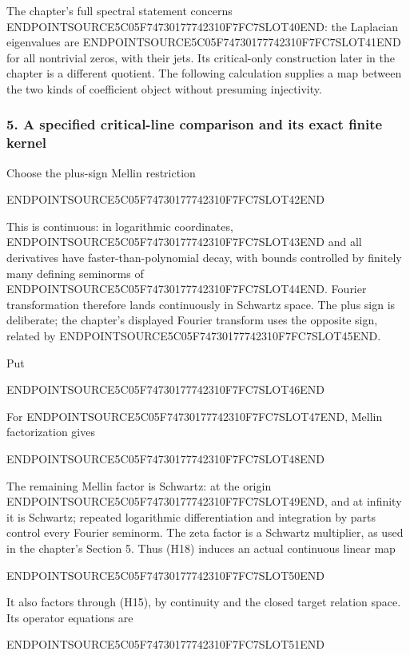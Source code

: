 The chapter's full spectral statement concerns ENDPOINTSOURCE5C05F74730177742310F7FC7SLOT40END: the Laplacian eigenvalues are ENDPOINTSOURCE5C05F74730177742310F7FC7SLOT41END for all nontrivial zeros, with their jets. Its critical-only construction later in the chapter is a different quotient. The following calculation supplies a map between the two kinds of coefficient object without presuming injectivity.

\subsubsection{5. A specified critical-line comparison and its exact finite kernel}\label{endpoint-cc_hochschild--a-specified-critical-line-comparison-and-its-exact-finite-kernel}

Choose the plus-sign Mellin restriction

ENDPOINTSOURCE5C05F74730177742310F7FC7SLOT42END

This is continuous: in logarithmic coordinates, ENDPOINTSOURCE5C05F74730177742310F7FC7SLOT43END and all derivatives have faster-than-polynomial decay, with bounds controlled by finitely many defining seminorms of ENDPOINTSOURCE5C05F74730177742310F7FC7SLOT44END. Fourier transformation therefore lands continuously in Schwartz space. The plus sign is deliberate; the chapter's displayed Fourier transform uses the opposite sign, related by ENDPOINTSOURCE5C05F74730177742310F7FC7SLOT45END.

Put

ENDPOINTSOURCE5C05F74730177742310F7FC7SLOT46END

For ENDPOINTSOURCE5C05F74730177742310F7FC7SLOT47END, Mellin factorization gives

ENDPOINTSOURCE5C05F74730177742310F7FC7SLOT48END

The remaining Mellin factor is Schwartz: at the origin ENDPOINTSOURCE5C05F74730177742310F7FC7SLOT49END, and at infinity it is Schwartz; repeated logarithmic differentiation and integration by parts control every Fourier seminorm. The zeta factor is a Schwartz multiplier, as used in the chapter's Section 5. Thus (H18) induces an actual continuous linear map

ENDPOINTSOURCE5C05F74730177742310F7FC7SLOT50END

It also factors through (H15), by continuity and the closed target relation space. Its operator equations are

ENDPOINTSOURCE5C05F74730177742310F7FC7SLOT51END

